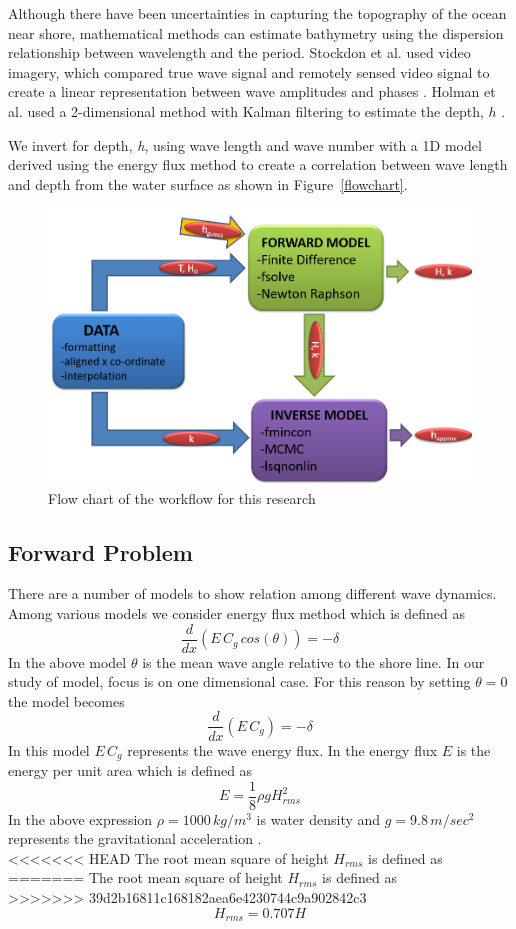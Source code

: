 Although there have been uncertainties in capturing the topography of the ocean near shore, mathematical methods can estimate bathymetry using the dispersion relationship between wavelength and the period. Stockdon et al. used video imagery, which compared true wave signal and remotely sensed video signal to create a linear representation between wave amplitudes and phases \citep{stockdon2000}.  Holman et al. used a 2-dimensional method with Kalman filtering to estimate the depth, $h$ \citep{holman2013}.

We invert for depth, \textit{h}, using wave length and wave number with a 1D model derived using the energy flux method to create a correlation between wave length and depth from the water surface as shown in Figure~\ref{flowchart}.

\begin{figure}[h]
		\centering
		\includegraphics[width=.40\linewidth]{img/Flow_Chart.png}
		\caption{Flow chart of the workflow for this research}
		\label{AWAC}
\end{figure}

\subsection{Forward Problem}\label{forwardproblem}

There are a number of models to show relation among different wave dynamics. Among various models we consider energy flux method which is defined as
$${\frac{d}{dx}}\left( E\,C_{g}\,cos (\theta)\right)= -\delta$$
In the above model ${\theta}$ is the mean wave angle relative to the shore line. In our study of model, focus is on one dimensional case. For this reason by setting ${\theta=0}$ the model becomes
\begin{equation}\label{eqn:forward}
\frac{d}{dx}\left(E\,C_{g}\right)=-\delta
\end{equation} 
In this model ${E\,C_{g}}$ represents the wave energy flux. In the energy flux ${E}$ is the energy per unit area which is defined as
\begin{equation}\label{eqn:energy}
E=\frac{1}{8}\rho g H_{rms}^2
\end{equation}
In the above expression ${\rho=1000\,kg/m^3}$ is water density   and ${g=9.8 \,m/sec^2}$ represents the gravitational acceleration . \\
<<<<<<< HEAD
The root mean square of height ${H_{rms}}$ is defined as\\
=======
The root mean square of height $H_{rms}$ is defined as\\
>>>>>>> 39d2b16811c168182aea6e4230744c9a902842c3
$${H_{rms}=0.707 H}$$\\

